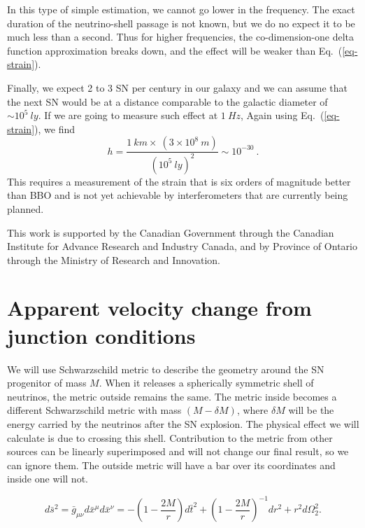 \documentclass[aps,showpacs,onecolumn,floats,prd,superscriptaddress,nofootinbib]{revtex4-1}
\begin{document}
In this type of simple estimation, we cannot go lower in the frequency. The exact duration of the neutrino-shell passage is not known, but we do no expect it to be much less than a second. Thus for higher frequencies, the co-dimension-one delta function approximation breaks down, and the effect will be weaker than Eq.~(\ref{eq-strain}).

Finally, we expect 2 to 3 SN per century in our galaxy and we can assume that the next SN would be at a distance comparable to the galactic diameter of $\sim 10^5 \ ly$. If we are going to measure such effect at $1 \ Hz$, Again using Eq.~(\ref{eq-strain}), we find
\begin{equation}
	h = \frac{ 1~km \times ~ (3\times10^8~m)}{(10^5~ly)^2}\sim 10^{-30}~.
\end{equation}
This requires a measurement of the strain that is six orders of magnitude better than BBO and is not yet achievable by interferometers that are currently being planned. 


\acknowledgments

This work is supported by the Canadian Government through the Canadian Institute for Advance Research and Industry Canada, and by Province of Ontario through the Ministry of Research and Innovation.

\appendix

\section{Apparent velocity change from junction conditions}
\label{sec-junc}

We will use Schwarzschild metric to describe the geometry around the SN progenitor of mass $M$.
When it releases a spherically symmetric shell of neutrinos, the metric outside remains the same.
The metric inside becomes a different Schwarzschild metric with mass $(M-\delta M)$, where $\delta M$ will be the energy carried by the neutrinos after the SN explosion. 
The physical effect we will calculate is due to crossing this shell.
Contribution to the metric from other sources can be linearly superimposed and will not change our final result, so we can ignore them.
The outside metric will have a bar over its coordinates and inside one will not. 
 
\begin{equation}
	d\bar{s}^2 = \bar{g}_{\mu \nu} d\bar{x}^\mu d\bar{x}^\nu = - \left( 1 - \frac{2M}{r} \right) d\bar{t}^2 + \left( 1 - \frac{2M}{r} \right)^{-1} d {r}^2 + r^2 d {\Omega}_2^2. \label{SCH}
\end{equation}
\end{document}
